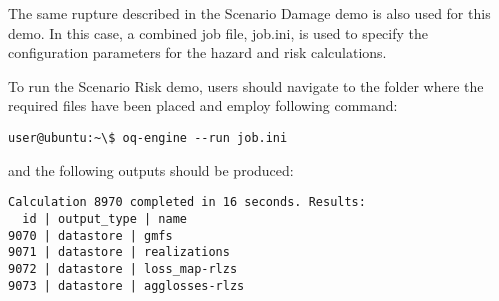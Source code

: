 The same rupture described in the Scenario Damage demo is also used for this
demo. In this case, a combined job file, job.ini, is used to specify the
configuration parameters for the hazard and risk calculations.

To run the Scenario Risk demo, users should navigate to the folder where the
required files have been placed and employ following command:

\begin{verbatim}
user@ubuntu:~\$ oq-engine --run job.ini
\end{verbatim}

and the following outputs should be produced:

\begin{verbatim}
Calculation 8970 completed in 16 seconds. Results:
  id | output_type | name
9070 | datastore | gmfs
9071 | datastore | realizations
9072 | datastore | loss_map-rlzs
9073 | datastore | agglosses-rlzs
\end{verbatim}
